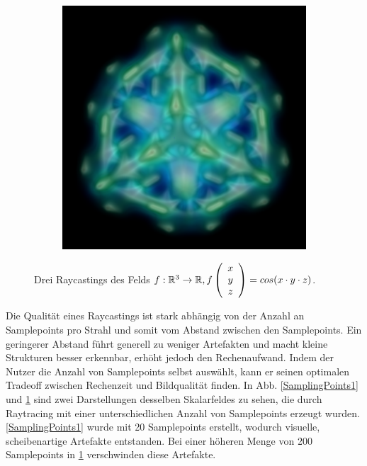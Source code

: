 \documentclass[a4paper,fontsize=12pt,toc=bib,halfparskip]{scrartcl}
\begin{document}
\begin{figure}
\begin{subfigure}{0.30\textwidth}
		\subcaption{}
		\label{SamplingPoints2}
	\end{subfigure}
	\hfill
	\begin{subfigure}{0.30\textwidth}
		\includegraphics[width=\textwidth]{pictures/DVR3.png}
		\subcaption{}
		\label{SamplingPoints3}
	\end{subfigure}
	\caption{Drei Raycastings des Felds $f:\mathbb{R}^3\rightarrow\mathbb{R}, f\left(\protect\begin{array}{c}x\\y\\z\protect\end{array}\right)=cos(x\cdot y\cdot z)$.}
	\label{SamplingPoints}
\end{figure}

Die Qualit\"at eines Raycastings ist stark abh\"angig von der Anzahl an Samplepoints pro Strahl und somit vom Abstand zwischen den Samplepoints. Ein geringerer Abstand f\"uhrt generell zu weniger Artefakten und macht kleine Strukturen besser erkennbar, erh\"oht jedoch den Rechenaufwand. Indem der Nutzer die Anzahl von Samplepoints selbst ausw\"ahlt, kann er seinen optimalen Tradeoff zwischen Rechenzeit und Bildqualit\"at finden. In Abb. \ref{SamplingPoints1} und \ref{SamplingPoints2} sind zwei Darstellungen desselben Skalarfeldes zu sehen, die durch Raytracing mit einer unterschiedlichen Anzahl von Samplepoints erzeugt wurden. \ref{SamplingPoints1} wurde mit 20 Samplepoints erstellt, wodurch visuelle, scheibenartige Artefakte entstanden. Bei einer h\"oheren Menge von 200 Samplepoints in \ref{SamplingPoints2} verschwinden diese Artefakte.
\end{document}

